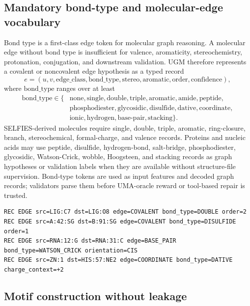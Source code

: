 \documentclass[11pt]{article}
\newcommand{\1}{\mathbf{1}}
\newcommand{\UGM}{\textsc{UGM}}
\begin{document}
\subsection{Mandatory bond-type and molecular-edge vocabulary}

Bond type is a first-class edge token for molecular graph reasoning. A molecular edge without bond type is insufficient for valence, aromaticity, stereochemistry, protonation, conjugation, and downstream validation. \UGM{} therefore represents a covalent or noncovalent edge hypothesis as a typed record
\[
  e=(u,v,\mathrm{edge\_class},\mathrm{bond\_type},\mathrm{stereo},\mathrm{aromatic},\mathrm{order},\mathrm{confidence}),
\]
where \(\mathrm{bond\_type}\) ranges over at least
\[
\begin{aligned}
\mathrm{bond\_type}\in\{&\text{none},\text{single},\text{double},\text{triple},\text{aromatic},\text{amide},\text{peptide},\\
&\text{phosphodiester},\text{glycosidic},\text{disulfide},\text{dative},\text{coordinate},\\
&\text{ionic},\text{hydrogen},\text{base-pair},\text{stacking}\}.
\end{aligned}
\]
SELFIES-derived molecules require single, double, triple, aromatic, ring-closure, branch, stereochemical, formal-charge, and valence records. Proteins and nucleic acids may use peptide, disulfide, hydrogen-bond, salt-bridge, phosphodiester, glycosidic, Watson-Crick, wobble, Hoogsteen, and stacking records as graph hypotheses or validation labels when they are available without structure-file supervision. Bond-type tokens are used as input features and decoded graph records; validators parse them before UMA-oracle reward or tool-based repair is trusted.

\begin{lstlisting}[caption={Bond-type-aware edge records.}]
REC EDGE src=LIG:C7 dst=LIG:O8 edge=COVALENT bond_type=DOUBLE order=2
REC EDGE src=A:42:SG dst=B:91:SG edge=COVALENT bond_type=DISULFIDE order=1
REC EDGE src=RNA:12:G dst=RNA:31:C edge=BASE_PAIR bond_type=WATSON_CRICK orientation=CIS
REC EDGE src=ZN:1 dst=HIS:57:NE2 edge=COORDINATE bond_type=DATIVE charge_context=+2
\end{lstlisting}

\subsection{Motif construction without leakage}
\end{document}
